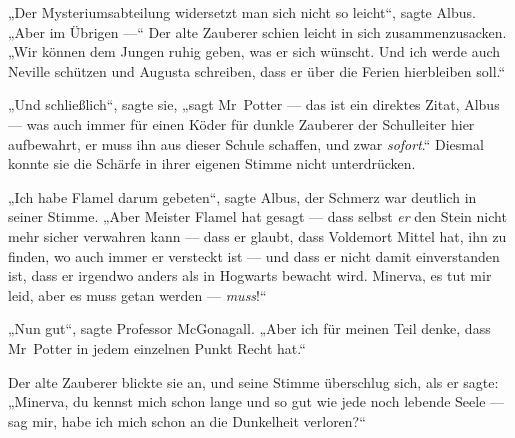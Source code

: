 „Der Mysteriumsabteilung widersetzt man sich nicht so leicht“, sagte Albus.
„Aber im Übrigen —“ Der alte Zauberer schien leicht in sich zusammenzusacken.
„Wir können dem Jungen ruhig geben, was er sich wünscht. Und ich werde auch Neville schützen und Augusta schreiben, dass er über die Ferien hierbleiben soll.“

„Und schließlich“, sagte sie, „sagt Mr~Potter — das ist ein direktes Zitat, Albus — was auch immer für einen Köder für dunkle Zauberer der Schulleiter hier aufbewahrt, er muss ihn aus dieser Schule schaffen, und zwar \emph{sofort}.“
Diesmal konnte sie die Schärfe in ihrer eigenen Stimme nicht unterdrücken.

„Ich habe Flamel darum gebeten“, sagte Albus, der Schmerz war deutlich in seiner Stimme.
„Aber Meister Flamel hat gesagt — dass selbst \emph{er} den Stein nicht mehr sicher verwahren kann — dass er glaubt, dass Voldemort Mittel hat, ihn zu finden, wo auch immer er versteckt ist — und dass er nicht damit einverstanden ist, dass er irgendwo anders als in Hogwarts bewacht wird. Minerva, es tut mir leid, aber es muss getan werden — \emph{muss}!“

„Nun gut“, sagte Professor McGonagall.
„Aber ich für meinen Teil denke, dass Mr~Potter in jedem einzelnen Punkt Recht hat.“

Der alte Zauberer blickte sie an, und seine Stimme überschlug sich, als er sagte:
„Minerva, du kennst mich schon lange und so gut wie jede noch lebende Seele — sag mir, habe ich mich schon an die Dunkelheit verloren?“

